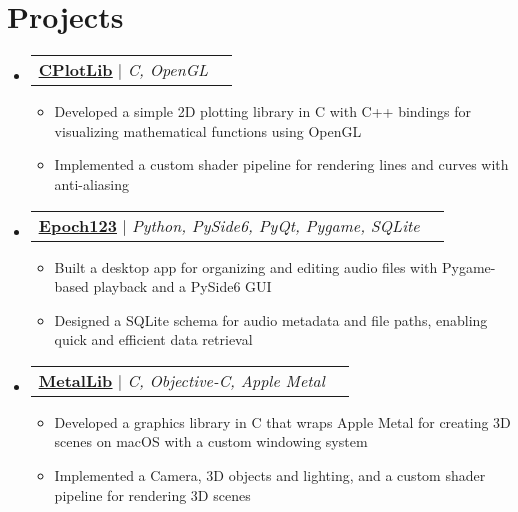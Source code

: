 \documentclass[letterpaper,11pt]{article}
\makeatletter
\newcommand{\resumeItem}[1]{\item\small{#1 \vspace{-2pt}}}
\newcommand{\resumeProjectHeading}[2]{
    \item
    \begin{tabular*}{0.97\textwidth}{l@{\extracolsep{\fill}}r}
      \small#1 & #2 \\
    \end{tabular*}\vspace{-7pt}
}
\newcommand{\resumeSubHeadingListStart}{\begin{itemize}[leftmargin=0.15in, label={}]}
\newcommand{\resumeSubHeadingListEnd}{\end{itemize}}
\newcommand{\resumeItemListStart}{\begin{itemize}}
\newcommand{\resumeItemListEnd}{\end{itemize}\vspace{-5pt}}
\makeatother
\begin{document}
\section{Projects}
    \resumeSubHeadingListStart
      \resumeProjectHeading
          {\textbf{\href{https://github.com/UlizesR/CPlotLib.git}{\underline{CPlotLib}}} $|$ \emph{C, OpenGL}}{}
          \resumeItemListStart
            \resumeItem{Developed a simple 2D plotting library in C with C++ bindings for visualizing mathematical functions using OpenGL}
            \resumeItem{Implemented a custom shader pipeline for rendering lines and curves with anti-aliasing}
          \resumeItemListEnd
      \resumeProjectHeading
      {\textbf{\href{https://github.com/UlizesR/Mach_1_Project}{\underline{Epoch123}}} $|$ \emph{Python, PySide6, PyQt, Pygame, SQLite}}{}
      \resumeItemListStart
        \resumeItem{Built a desktop app for organizing and editing audio files with Pygame-based playback and a PySide6 GUI}
        \resumeItem{Designed a SQLite schema for audio metadata and file paths, enabling quick and efficient data retrieval}
      \resumeItemListEnd
      \resumeProjectHeading
      {\textbf{\href{https://github.com/UlizesR/MetalLib}{\underline{MetalLib}}} $|$ \emph{C, Objective-C, Apple Metal}}{}
      \resumeItemListStart
        \resumeItem{Developed a graphics library in C that wraps Apple Metal for creating 3D scenes on macOS with a custom windowing system}
        \resumeItem{Implemented a Camera, 3D objects and lighting, and a custom shader pipeline for rendering 3D scenes}
      \resumeItemListEnd
    \resumeSubHeadingListEnd
\end{document}
